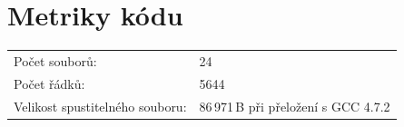 \documentclass[12pt,a4paper,titlepage,final]{article}
\begin{document}
\section{Metriky kódu} \label{metriky}
\begin{tabular}{ll}
  Počet souborů: & 24 \\
  Počet řádků: & 5644 \\
  Velikost spustitelného souboru: & 86\,971\,B při přeložení s GCC 4.7.2\\
\end{tabular}

%
%
%
\appendix

\end{document}

